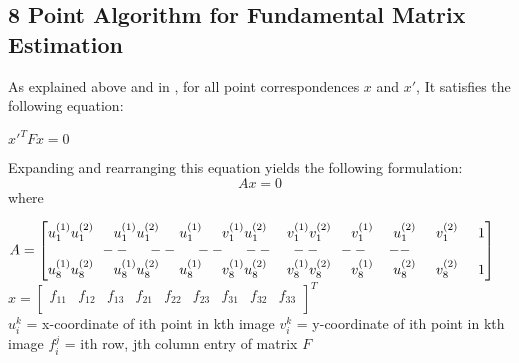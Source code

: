 \documentclass[11pt, a4paper, openany]{article}
\begin{document}
\subsection{8 Point Algorithm for Fundamental Matrix Estimation} \label{8pointsec} As explained above and in \cite{8point}, for all point correspondences $x$ and $x'$, It satisfies the following equation:
\begin{center}
$x'^{T}Fx=0$
\end{center}
Expanding and rearranging this equation yields the following formulation:
\begin{equation}\label{eq1}
Ax = 0
\end{equation}
where
\begin{center}
$A = \begin{bmatrix}  u_{1}^{(1)}u_{1}^{(2)}  \hspace{5mm} u_{1}^{(1)}u_{1}^{(2)} \hspace{5mm} u_{1}^{(1)}  \hspace{5mm} v_{1}^{(1)}u_{1}^{(2)}  \hspace{5mm} v_{1}^{(1)}v_{1}^{(2)}  \hspace{5mm} v_{1}^{(1)} \hspace{5mm} u_{1}^{(2)} \hspace{5mm} v_{1}^{(2)} \hspace{5mm} 1\\   -- \hspace{5mm}  -- \hspace{5mm}  -- \hspace{5mm}  -- \hspace{5mm}  -- \hspace{5mm}  -- \hspace{5mm}  -- \hspace{5mm}  \\   u_{8}^{(1)}u_{8}^{(2)}  \hspace{5mm} u_{8}^{(1)}u_{8}^{(2)} \hspace{5mm} u_{8}^{(1)}  \hspace{5mm} v_{8}^{(1)}u_{8}^{(2)}  \hspace{5mm} v_{8}^{(1)}v_{8}^{(2)}  \hspace{5mm} v_{8}^{(1)} \hspace{5mm} u_{8}^{(2)} \hspace{5mm} v_{8}^{(2)} \hspace{5mm} 1  \end{bmatrix}$\\[10pt]
$x = \begin{bmatrix} f_{11}&f_{12}&f_{13}&f_{21}&f_{22}&f_{23}&f_{31}&f_{32}&f_{33}\\ \end{bmatrix}^T$\\[10pt]
$u_{i}^{k}$ = x-coordinate of ith point in kth image\newline
$v_{i}^{k}$ = y-coordinate of ith point in kth image\newline
$f_{i}^{j}$ = ith row, jth column entry of matrix $F$\newline
\end{center}
\end{document}
